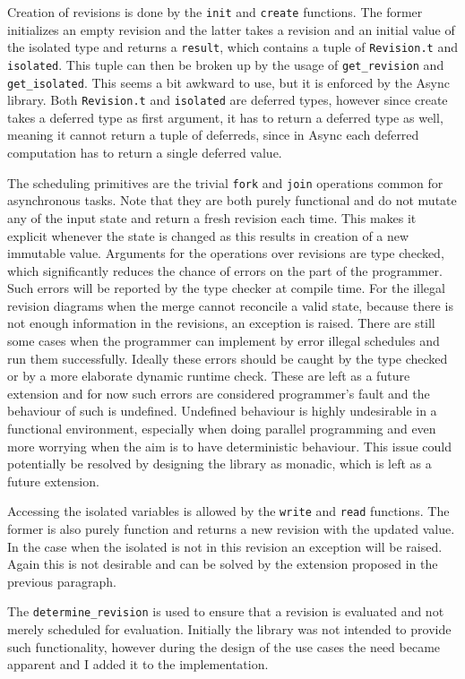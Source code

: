 \documentclass[12pt,twoside,notitlepage]{report}
\begin{document}
 
Creation of revisions is done by the {\tt init} and {\tt create} functions. The former initializes an empty revision and the latter takes a revision and an initial value of the isolated type and returns a {\tt result}, which contains a tuple of {\tt Revision.t} and {\tt isolated}. This tuple can then be broken up by the usage of {\tt get\_revision} and {\tt get\_isolated}. This seems a bit awkward to use, but it is enforced by the Async library. Both {\tt Revision.t} and {\tt isolated} are deferred types, however since create takes a deferred type as first argument, it has to return a deferred type as well, meaning it cannot return a tuple of deferreds, since in Async each deferred computation has to return a single deferred value.

The scheduling primitives are the trivial {\tt fork} and {\tt join} operations common for asynchronous tasks. Note that they are both purely functional and do not mutate any of the input state and return a fresh revision each time. This makes it explicit whenever the state is changed as this results in creation of a new immutable value. Arguments for the operations over revisions are type checked, which significantly reduces the chance of errors on the part of the programmer. Such errors will be reported by the type checker at compile time. For the illegal revision diagrams when the merge cannot reconcile a valid state, because there is not enough information in the revisions, an exception is raised. There are still some cases when the programmer can implement by error illegal schedules and run them successfully. Ideally these errors should be caught by the type checked or by a more elaborate dynamic runtime check. These are left as a future extension and for now such errors are considered programmer's fault and the behaviour of such is undefined. Undefined behaviour is highly undesirable in a functional environment, especially when doing parallel programming and even more worrying when the aim is to have deterministic behaviour. This issue could potentially be resolved by designing the library as monadic, which is left as a future extension.   

Accessing the isolated variables is allowed by the {\tt write} and {\tt read} functions.
The former is also purely function and returns a new revision with the updated value. In the case when the isolated is not in this revision an exception will be raised. Again this is not desirable and can be solved by the extension proposed in the previous paragraph.

The {\tt determine\_revision} is used to ensure that a revision is evaluated and not merely scheduled for evaluation. Initially the library was not intended to provide such functionality, however during the design of the use cases the need became apparent and I added it to the implementation.
\end{document}
